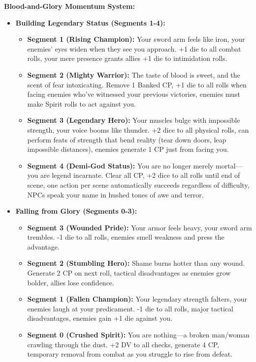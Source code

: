 \documentclass[11pt]{article}
\begin{document}
\textbf{Blood-and-Glory Momentum System:}
\begin{itemize}
\item \textbf{Building Legendary Status (Segments 1-4):}
  \begin{itemize}
  \item \textbf{Segment 1 (Rising Champion):} Your sword arm feels like iron, your enemies' eyes widen when they see you approach. +1 die to all combat rolls, your mere presence grants allies +1 die to intimidation rolls.
  \item \textbf{Segment 2 (Mighty Warrior):} The taste of blood is sweet, and the scent of fear intoxicating. Remove 1 Banked CP, +1 die to all rolls when facing enemies who've witnessed your previous victories, enemies must make Spirit rolls to act against you.
  \item \textbf{Segment 3 (Legendary Hero):} Your muscles bulge with impossible strength, your voice booms like thunder. +2 dice to all physical rolls, can perform feats of strength that bend reality (tear down doors, leap impossible distances), enemies generate 1 CP just from facing you.
  \item \textbf{Segment 4 (Demi-God Status):} You are no longer merely mortal—you are legend incarnate. Clear all CP, +2 dice to all rolls until end of scene, one action per scene automatically succeeds regardless of difficulty, NPCs speak your name in hushed tones of awe and terror.
  \end{itemize}
\item \textbf{Falling from Glory (Segments 0-3):}
  \begin{itemize}
  \item \textbf{Segment 3 (Wounded Pride):} Your armor feels heavy, your sword arm trembles. -1 die to all rolls, enemies smell weakness and press the advantage.
  \item \textbf{Segment 2 (Stumbling Hero):} Shame burns hotter than any wound. Generate 2 CP on next roll, tactical disadvantages as enemies grow bolder, allies lose confidence.
  \item \textbf{Segment 1 (Fallen Champion):} Your legendary strength falters, your enemies laugh at your predicament. -1 die to all rolls, major tactical disadvantages, enemies gain +1 die against you.
  \item \textbf{Segment 0 (Crushed Spirit):} You are nothing—a broken man/woman crawling through the dust. +2 DV to all checks, generate 4 CP, temporary removal from combat as you struggle to rise from defeat.
  \end{itemize}

\end{itemize}
\end{document}
